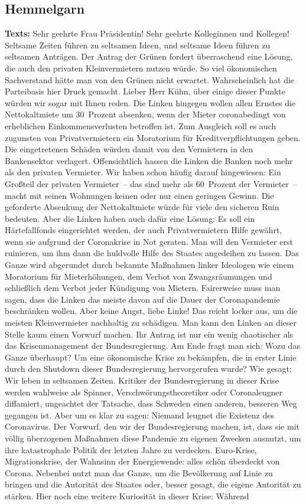 \documentclass{article}
\begin{document}
\subsection{Hemmelgarn}
\noindent\textbf{Texts:} Sehr geehrte Frau Präsidentin! Sehr geehrte Kolleginnen und Kollegen! Seltsame Zeiten führen zu seltsamen Ideen, und seltsame Ideen führen zu seltsamen Anträgen. Der Antrag der Grünen fordert überraschend eine Lösung, die auch den privaten Kleinvermietern nutzen würde. So viel ökonomischen Sachverstand hätte man von den Grünen nicht erwartet. Wahrscheinlich hat die Parteibasis hier Druck gemacht.  Lieber Herr Kühn, über einige dieser Punkte würden wir sogar mit Ihnen reden. Die Linken hingegen wollen allen Ernstes die Nettokaltmiete um 30 Prozent absenken, wenn der Mieter coronabedingt von erheblichen Einkommensverlusten betroffen ist. Zum Ausgleich soll es auch zugunsten von Privatvermietern ein Moratorium für Kreditverpflichtungen geben. Die eingetretenen Schäden würden damit von den Vermietern in den Bankensektor verlagert. Offensichtlich hassen die Linken die Banken noch mehr als den privaten Vermieter.  Wir haben schon häufig darauf hingewiesen: Ein Großteil der privaten Vermieter – das sind mehr als 60 Prozent der Vermieter – macht mit seinen Wohnungen keinen oder nur einen geringen Gewinn. Die geforderte Absenkung der Nettokaltmiete würde für viele den sicheren Ruin bedeuten. Aber die Linken haben auch dafür eine Lösung: Es soll ein Härtefallfonds eingerichtet werden, der auch Privatvermietern Hilfe gewährt, wenn sie aufgrund der Coronakrise in Not geraten.  Man will den Vermieter erst ruinieren, um ihm dann die huldvolle Hilfe des Staates angedeihen zu lassen. Das Ganze wird abgerundet durch bekannte Maßnahmen linker Ideologen wie einem Moratorium für Mieterhöhungen, dem Verbot von Zwangsräumungen und schließlich dem Verbot jeder Kündigung von Mietern. Fairerweise muss man sagen, dass die Linken das meiste davon auf die Dauer der Coronapandemie beschränken wollen. Aber keine Angst, liebe Linke! Das reicht locker aus, um die meisten Kleinvermieter nachhaltig zu schädigen. Man kann den Linken an dieser Stelle kaum einen Vorwurf machen. Ihr Antrag ist nur ein wenig chaotischer als das Krisenmanagement der Bundesregierung. Am Ende fragt man sich: Wozu das Ganze überhaupt? Um eine ökonomische Krise zu bekämpfen, die in erster Linie durch den Shutdown dieser Bundesregierung hervorgerufen wurde?  Wie gesagt: Wir leben in seltsamen Zeiten. Kritiker der Bundesregierung in dieser Krise werden wahlweise als Spinner, Verschwörungstheoretiker oder Coronaleugner diffamiert, ungeachtet der Tatsache, dass Schweden einen anderen, besseren Weg gegangen ist.  Aber um es klar zu sagen: Niemand leugnet die Existenz des Coronavirus.  Der Vorwurf, den wir der Bundesregierung machen, ist, dass sie mit völlig überzogenen Maßnahmen diese Pandemie zu eigenen Zwecken ausnutzt, um ihre katastrophale Politik der letzten Jahre zu verdecken.  Euro-Krise, Migrationskrise, der Wahnsinn der Energiewende: alles schön überdeckt von Corona. Nebenbei nutzt man das Ganze, um die Bevölkerung auf Linie zu bringen und die Autorität des Staates oder, besser gesagt, die eigene Autorität zu stärken. Hier noch eine weitere Kuriosität in dieser Krise: Während 
\end{document}
